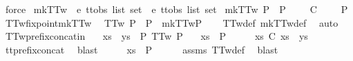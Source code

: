 \ force%
\endisatagproof
{\isafoldproof}%
%
\isadelimproof
\isanewline
%
\endisadelimproof
\isanewline
{}\isamarkupfalse%
\ mkTT{}w\ {\isacharcolon}{\isacharcolon}\ {\isachardoublequoteopen}{\isacharprime}e\ ttobs\ list\ set\ {\isasymRightarrow}\ {\isacharprime}e\ ttobs\ list\ set{\isachardoublequoteclose}\ \isanewline
{\isachardoublequoteopen}mkTT{}w\ P\ {\isacharequal}\ P\ {\isasymunion}\ {\isacharbraceleft}{\isasymrho}{\isacharbar}{\isasymrho}\ {\isasymsigma}{\isachardot}\ {\isasymrho}\ {\isasymle}\isactrlsub C\ {\isasymsigma}\ {\isasymand}\ {\isasymsigma}\ {\isasymin}\ P{\isacharbraceright}{\isachardoublequoteclose}\isanewline
\isanewline
{}\isamarkupfalse%
\ TT{}w{\isacharunderscore}fixpoint{\isacharunderscore}mkTT{}w{\isacharcolon}\isanewline
\ \ {\isachardoublequoteopen}TT{}w\ P\ {\isacharequal}\ {\isacharparenleft}P\ {\isacharequal}\ mkTT{}w{\isacharparenleft}P{\isacharparenright}{\isacharparenright}{\isachardoublequoteclose}\isanewline
%
\isadelimproof
\ \ %
\endisadelimproof
%
\isatagproof
{}\isamarkupfalse%
\ TT{}w{\isacharunderscore}def\ mkTT{}w{\isacharunderscore}def\ \isamarkupfalse%
\ auto%
\endisatagproof
{\isafoldproof}%
%
\isadelimproof
\isanewline
%
\endisadelimproof
\isanewline
{}\isamarkupfalse%
\ TT{}w{\isacharunderscore}prefix{\isacharunderscore}concat{\isacharunderscore}in{\isacharcolon}\isanewline
\ \ \ {\isachardoublequoteopen}xs\ {\isacharat}\ ys\ {\isasymin}\ P{\isachardoublequoteclose}\ {\isachardoublequoteopen}TT{}w\ P{\isachardoublequoteclose}\isanewline
\ \ \ {\isachardoublequoteopen}xs\ {\isasymin}\ P{\isachardoublequoteclose}\isanewline
%
\isadelimproof
%
\endisadelimproof
%
\isatagproof
{}\isamarkupfalse%
\ {\isacharminus}\isanewline
\ \ \isamarkupfalse%
\ {\isachardoublequoteopen}xs\ {\isasymle}\isactrlsub C\ xs\ {\isacharat}\ ys{\isachardoublequoteclose}\isanewline
\ \ \ \ \isamarkupfalse%
\ tt{\isacharunderscore}prefix{\isacharunderscore}concat\ \isamarkupfalse%
\ blast\isanewline
\ \ \isamarkupfalse%
\ \isamarkupfalse%
\ {\isachardoublequoteopen}xs\ {\isasymin}\ P{\isachardoublequoteclose}\isanewline
\ \ \ \ \isamarkupfalse%
\ assms\ TT{}w{\isacharunderscore}def\ \isamarkupfalse%
\ blast\isanewline
\ \ \isamarkupfalse%

